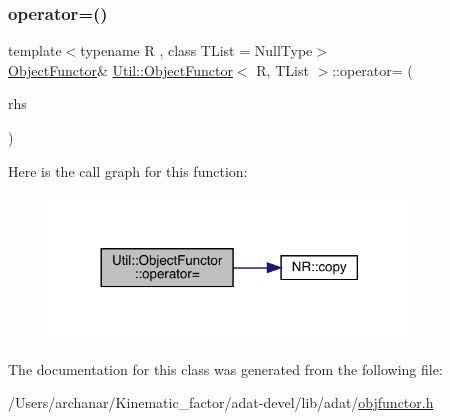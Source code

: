 \subsubsection{\texorpdfstring{operator=()}{operator=()}\hspace{0.1cm}{\footnotesize\ttfamily [3/3]}}
{\footnotesize\ttfamily template$<$typename R , class T\+List  = Null\+Type$>$ \\
\mbox{\hyperlink{classUtil_1_1ObjectFunctor}{Object\+Functor}}\& \mbox{\hyperlink{classUtil_1_1ObjectFunctor}{Util\+::\+Object\+Functor}}$<$ R, T\+List $>$\+::operator= (\begin{DoxyParamCaption}\item[{const \mbox{\hyperlink{classUtil_1_1ObjectFunctor}{Object\+Functor}}$<$ R, T\+List $>$ \&}]{rhs }\end{DoxyParamCaption})\hspace{0.3cm}{\ttfamily [inline]}}

Here is the call graph for this function\+:
\nopagebreak
\begin{figure}[H]
\begin{center}
\leavevmode
\includegraphics[width=272pt]{d3/de7/classUtil_1_1ObjectFunctor_a90395c8be24965e154bee2f7813a78e8_cgraph}
\end{center}
\end{figure}


The documentation for this class was generated from the following file\+:\begin{DoxyCompactItemize}
\item 
/\+Users/archanar/\+Kinematic\+\_\+factor/adat-\/devel/lib/adat/\mbox{\hyperlink{adat-devel_2lib_2adat_2objfunctor_8h}{objfunctor.\+h}}\end{DoxyCompactItemize}
